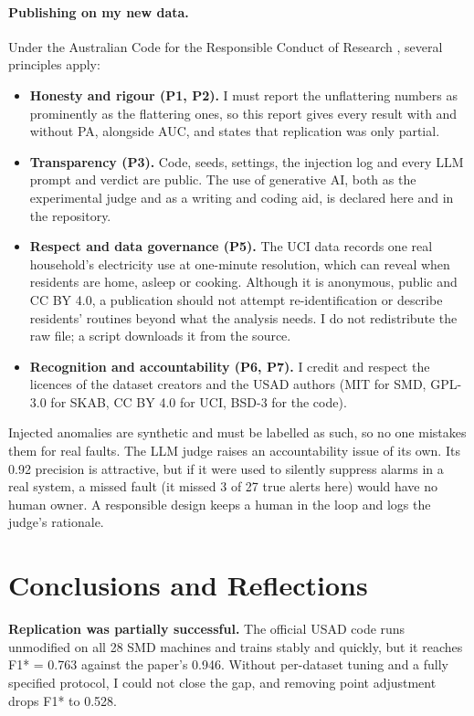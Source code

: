 \documentclass[11pt]{article}
\begin{document}
\paragraph{Publishing on my new data.} Under the Australian Code for the Responsible Conduct of Research \citep{nhmrc2018code}, several principles apply:
\begin{itemize}
\item \textbf{Honesty and rigour (P1, P2).} I must report the unflattering numbers as prominently as the flattering ones, so this report gives every result with and without PA, alongside AUC, and states that replication was only partial.
\item \textbf{Transparency (P3).} Code, seeds, settings, the injection log and every LLM prompt and verdict are public. The use of generative AI, both as the experimental judge and as a writing and coding aid, is declared here and in the repository.
\item \textbf{Respect and data governance (P5).} The UCI data records one real household's electricity use at one-minute resolution, which can reveal when residents are home, asleep or cooking. Although it is anonymous, public and CC BY 4.0, a publication should not attempt re-identification or describe residents' routines beyond what the analysis needs. I do not redistribute the raw file; a script downloads it from the source.
\item \textbf{Recognition and accountability (P6, P7).} I credit and respect the licences of the dataset creators and the USAD authors (MIT for SMD, GPL-3.0 for SKAB, CC BY 4.0 for UCI, BSD-3 for the code).
\end{itemize}

Injected anomalies are synthetic and must be labelled as such, so no one mistakes them for real faults. The LLM judge raises an accountability issue of its own. Its 0.92 precision is attractive, but if it were used to silently suppress alarms in a real system, a missed fault (it missed 3 of 27 true alerts here) would have no human owner. A responsible design keeps a human in the loop and logs the judge's rationale.

\section{Conclusions and Reflections}
\label{sec:concl}

\textbf{Replication was partially successful.} The official USAD code runs unmodified on all 28 SMD machines and trains stably and quickly, but it reaches F1* = 0.763 against the paper's 0.946. Without per-dataset tuning and a fully specified protocol, I could not close the gap, and removing point adjustment drops F1* to 0.528.
\end{document}

